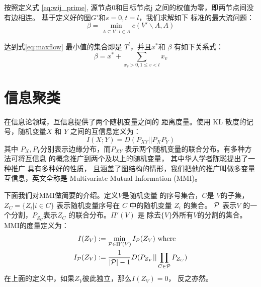 按照定义式 \eqref{eq:wij_prime}, 源节点0和目标节点j
之间的权值为零，即两节点间没有边相连。
基于定义好的图$G'$和$s=0,t=l$，我们求解如下
标准的最大流问题：
\begin{equation}\label{eq:maxflow}
  \beta = \min_{A \subseteq V^l: l\in A }
  c(V' \backslash A, A)
\end{equation}

达到式\eqref{eq:maxflow}
最小值的集合即是 $T^l$，并且$x^*$和 $\beta$
有如下关系式：
\begin{equation}\label{eq:beta_alpha}
  \beta = x^* + \sum_{x_v > 0, 1\leq v < l} x_v
\end{equation}

\section{信息聚类}
在信息论领域，互信息提供了两个随机变量之间的
距离度量。使用 KL 散度的记号，随机变量$X$
和 $Y$ 之间的互信息定义为：
\begin{equation}\label{eq:mutual_info}
  I(X;Y) = D(P_{XY} ||P_XP_Y)
\end{equation}
其中 $P_X, P_Y$分别表示边缘分布，而$P_{XY}$
表示两个随机变量的联合分布。有多种方法可将互信息
的概念推广到两个及以上的随机变量，
其中华人学者陈聪提出了一种推广 \cite{ska} 具有多种好的性质，
且涵盖了图结构的情形，我们把他的推广叫做多变量互信息，英文全称是
Multivariate Mutual Information (MMI)。

下面我们对MMI做简要的介绍。定义$V$是随机变量
的序号集合，$C$是 $V$的子集，$Z_C=\{Z_i | i \in C\}$
表示随机变量序号在 $C$ 中的随机变量 $Z_i$ 的集合。
$\P$ 表示$V$ 的一个分割，$P_{Z_C}$表示$Z_C$
的联合分布。$\Pi'(V)$ 是
除去$\{V\}$外所有$V$的分割的集合。MMI的度量定义为：
\begin{align}
  I(Z_V) &:= \min_{\P \in \Pi'(V)} I_{\P}(Z_V) \textrm{ where } \label{eq:IZV}\\  
  I_{\P}(Z_V) &:= \frac{1}{|\P| - 1}D(P_{Z_V} || \prod_{C\in \P} P_{Z_C}) \label{eq:IPZV}
\end{align}
在上面的定义中，如果$Z_V$彼此独立，那么$I(Z_V)=0$，
反之亦然。

